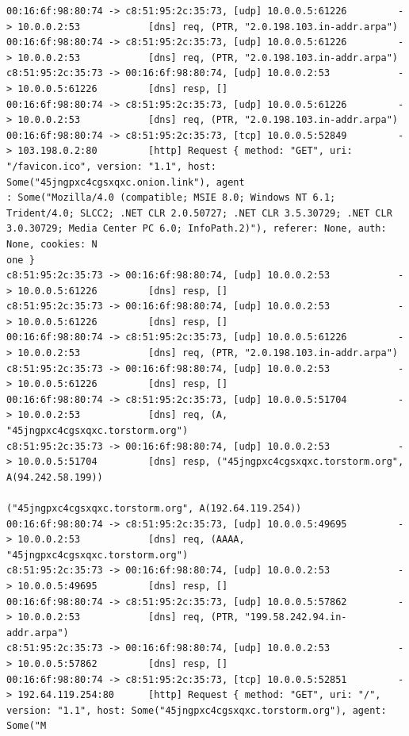 \documentclass[11pt]{diazessay} %
\begin{document}
\begin{lstlisting}
00:16:6f:98:80:74 -> c8:51:95:2c:35:73, [udp] 10.0.0.5:61226         -> 10.0.0.2:53            [dns] req, (PTR, "2.0.198.103.in-addr.arpa")
00:16:6f:98:80:74 -> c8:51:95:2c:35:73, [udp] 10.0.0.5:61226         -> 10.0.0.2:53            [dns] req, (PTR, "2.0.198.103.in-addr.arpa")
c8:51:95:2c:35:73 -> 00:16:6f:98:80:74, [udp] 10.0.0.2:53            -> 10.0.0.5:61226         [dns] resp, []
00:16:6f:98:80:74 -> c8:51:95:2c:35:73, [udp] 10.0.0.5:61226         -> 10.0.0.2:53            [dns] req, (PTR, "2.0.198.103.in-addr.arpa")
00:16:6f:98:80:74 -> c8:51:95:2c:35:73, [tcp] 10.0.0.5:52849         -> 103.198.0.2:80         [http] Request { method: "GET", uri: "/favicon.ico", version: "1.1", host: Some("45jngpxc4cgsxqxc.onion.link"), agent
: Some("Mozilla/4.0 (compatible; MSIE 8.0; Windows NT 6.1; Trident/4.0; SLCC2; .NET CLR 2.0.50727; .NET CLR 3.5.30729; .NET CLR 3.0.30729; Media Center PC 6.0; InfoPath.2)"), referer: None, auth: None, cookies: N
one }
c8:51:95:2c:35:73 -> 00:16:6f:98:80:74, [udp] 10.0.0.2:53            -> 10.0.0.5:61226         [dns] resp, []
c8:51:95:2c:35:73 -> 00:16:6f:98:80:74, [udp] 10.0.0.2:53            -> 10.0.0.5:61226         [dns] resp, []
00:16:6f:98:80:74 -> c8:51:95:2c:35:73, [udp] 10.0.0.5:61226         -> 10.0.0.2:53            [dns] req, (PTR, "2.0.198.103.in-addr.arpa")
c8:51:95:2c:35:73 -> 00:16:6f:98:80:74, [udp] 10.0.0.2:53            -> 10.0.0.5:61226         [dns] resp, []
00:16:6f:98:80:74 -> c8:51:95:2c:35:73, [udp] 10.0.0.5:51704         -> 10.0.0.2:53            [dns] req, (A, "45jngpxc4cgsxqxc.torstorm.org")
c8:51:95:2c:35:73 -> 00:16:6f:98:80:74, [udp] 10.0.0.2:53            -> 10.0.0.5:51704         [dns] resp, ("45jngpxc4cgsxqxc.torstorm.org", A(94.242.58.199))
                                                                                                           ("45jngpxc4cgsxqxc.torstorm.org", A(192.64.119.254))
00:16:6f:98:80:74 -> c8:51:95:2c:35:73, [udp] 10.0.0.5:49695         -> 10.0.0.2:53            [dns] req, (AAAA, "45jngpxc4cgsxqxc.torstorm.org")
c8:51:95:2c:35:73 -> 00:16:6f:98:80:74, [udp] 10.0.0.2:53            -> 10.0.0.5:49695         [dns] resp, []
00:16:6f:98:80:74 -> c8:51:95:2c:35:73, [udp] 10.0.0.5:57862         -> 10.0.0.2:53            [dns] req, (PTR, "199.58.242.94.in-addr.arpa")
c8:51:95:2c:35:73 -> 00:16:6f:98:80:74, [udp] 10.0.0.2:53            -> 10.0.0.5:57862         [dns] resp, []
00:16:6f:98:80:74 -> c8:51:95:2c:35:73, [tcp] 10.0.0.5:52851         -> 192.64.119.254:80      [http] Request { method: "GET", uri: "/", version: "1.1", host: Some("45jngpxc4cgsxqxc.torstorm.org"), agent: Some("M

\end{lstlisting}
\end{document}
